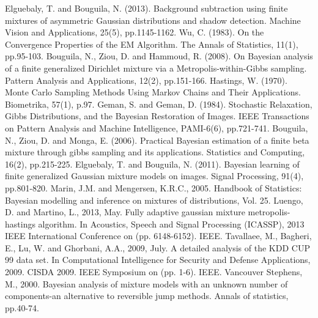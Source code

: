 \documentclass[conference]{llncs}
\begin{document}
\begin{thebibliography}{[MT1]}
 Elguebaly, T. and Bouguila, N. (2013). Background subtraction using finite mixtures of asymmetric Gaussian distributions and shadow detection. Machine Vision and Applications, 25(5), pp.1145-1162.
 Wu, C. (1983). On the Convergence Properties of the EM Algorithm. The Annals of Statistics, 11(1), pp.95-103.
 Bouguila, N., Ziou, D. and Hammoud, R. (2008). On Bayesian analysis of a finite generalized Dirichlet mixture via a Metropolis-within-Gibbs sampling. Pattern Analysis and Applications, 12(2), pp.151-166.
 Hastings, W. (1970). Monte Carlo Sampling Methods Using Markov Chains and Their Applications. Biometrika, 57(1), p.97.
Geman, S. and Geman, D. (1984). Stochastic Relaxation, Gibbs Distributions, and the Bayesian Restoration of Images. IEEE Transactions on Pattern Analysis and Machine Intelligence, PAMI-6(6), pp.721-741.
 Bouguila, N., Ziou, D. and Monga, E. (2006). Practical Bayesian estimation of a finite beta mixture through gibbs sampling and its applications. Statistics and Computing, 16(2), pp.215-225.
 Elguebaly, T. and Bouguila, N. (2011). Bayesian learning of finite generalized Gaussian mixture models on images. Signal Processing, 91(4), pp.801-820.
 Marin, J.M. and Mengersen, K.R.C., 2005. Handbook of Statistics: Bayesian modelling and inference on mixtures of distributions, Vol. 25.
 Luengo, D. and Martino, L., 2013, May. Fully adaptive gaussian mixture metropolis-hastings algorithm. In Acoustics, Speech and Signal Processing (ICASSP), 2013 IEEE International Conference on (pp. 6148-6152). IEEE.
 Tavallaee, M., Bagheri, E., Lu, W. and Ghorbani, A.A., 2009, July. A detailed analysis of the KDD CUP 99 data set. In Computational Intelligence for Security and Defense Applications, 2009. CISDA 2009. IEEE Symposium on (pp. 1-6). IEEE.
Vancouver	
 Stephens, M., 2000. Bayesian analysis of mixture models with an unknown number of components-an alternative to reversible jump methods. Annals of statistics, pp.40-74.
\end{thebibliography}
\end{document}
